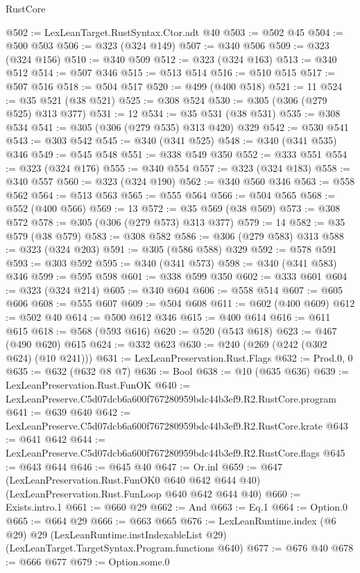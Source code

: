 \begin{lexlean}{RustCore}
\begin{coremodule}
@502 := LexLeanTarget.RustSyntax.Ctor.adt @40
@503 := @502 @45
@504 := @500 @503
@506 := @323 (@324 @149)
@507 := @340 @506
@509 := @323 (@324 @156)
@510 := @340 @509
@512 := @323 (@324 @163)
@513 := @340 @512
@514 := @507 @346
@515 := @513 @514
@516 := @510 @515
@517 := @507 @516
@518 := @504 @517
@520 := @499 (@400 @518)
@521 := 11
@524 := @35 @521 (@38 @521)
@525 := @308 @524
@530 := @305 (@306 (@279 @525) @313 @377)
@531 := 12
@534 := @35 @531 (@38 @531)
@535 := @308 @534
@541 := @305 (@306 (@279 @535) @313 @420) @329
@542 := @530 @541
@543 := @303 @542
@545 := @340 (@341 @525)
@548 := @340 (@341 @535) @346
@549 := @545 @548
@551 := @338 @549 @350
@552 := @333 @551
@554 := @323 (@324 @176)
@555 := @340 @554
@557 := @323 (@324 @183)
@558 := @340 @557
@560 := @323 (@324 @190)
@562 := @340 @560 @346
@563 := @558 @562
@564 := @513 @563
@565 := @555 @564
@566 := @504 @565
@568 := @552 (@400 @566)
@569 := 13
@572 := @35 @569 (@38 @569)
@573 := @308 @572
@578 := @305 (@306 (@279 @573) @313 @377)
@579 := 14
@582 := @35 @579 (@38 @579)
@583 := @308 @582
@586 := @306 (@279 @583) @313
@588 := @323 (@324 @203)
@591 := @305 (@586 @588) @329
@592 := @578 @591
@593 := @303 @592
@595 := @340 (@341 @573)
@598 := @340 (@341 @583) @346
@599 := @595 @598
@601 := @338 @599 @350
@602 := @333 @601
@604 := @323 (@324 @214)
@605 := @340 @604
@606 := @558 @514
@607 := @605 @606
@608 := @555 @607
@609 := @504 @608
@611 := @602 (@400 @609)
@612 := @502 @40
@614 := @500 @612 @346
@615 := @400 @614
@616 := @611 @615
@618 := @568 (@593 @616)
@620 := @520 (@543 @618)
@623 := @467 (@490 @620) @615
@624 := @332 @623
@630 := @240 (@269 (@242 (@302 @624) (@10 @241)))
@631 := LexLeanPreservation.Rust.Flags
@632 := Prod.{0, 0}
@635 := @632 (@632 @8 @7)
@636 := Bool
@638 := @10 (@635 @636)
@639 := LexLeanPreservation.Rust.FunOK
@640 := LexLeanPreserve.C5d07dcb6a600f767280959bdc44b3ef9.R2.RustCore.program
@641 := @639 @640
@642 := LexLeanPreserve.C5d07dcb6a600f767280959bdc44b3ef9.R2.RustCore.krate
@643 := @641 @642
@644 := LexLeanPreserve.C5d07dcb6a600f767280959bdc44b3ef9.R2.RustCore.flags
@645 := @643 @644
@646 := @645 @40
@647 := Or.inl
@659 := @647
    (LexLeanPreservation.Rust.FunOK0 @640 @642 @644 @40)
    (LexLeanPreservation.Rust.FunLoop @640 @642 @644 @40)
@660 := Exists.intro.{1}
@661 := @660 @29
@662 := And
@663 := Eq.{1}
@664 := Option.{0}
@665 := @664 @29
@666 := @663 @665
@676 := LexLeanRuntime.index
    (@6 @29)
    @29
    (LexLeanRuntime.instIndexableList @29)
    (LexLeanTarget.TargetSyntax.Program.functions @640)
@677 := @676 @40
@678 := @666 @677
@679 := Option.some.{0}

\end{coremodule}
\end{lexlean}
